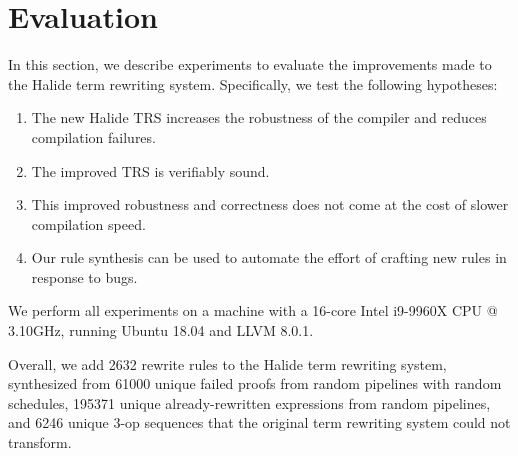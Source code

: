 \documentclass[sigplan,10pt,review,anonymous]{acmart}\settopmatter{printfolios=true,printccs=false,printacmref=false}
\newcommand{\NumRulesSynthesized}{{\color{black} 2632}\xspace}
\newcommand{\NumOpSequences}{{\color{black} 6246}\xspace}
\newcommand{\NumFailureExamples}{{\color{black} 61000}\xspace}
\newcommand{\NumSimplifiedExpressions}{{\color{black} 195371}\xspace}
\begin{document}
\section{Evaluation}
In this section, we describe experiments to evaluate the improvements made to the Halide term rewriting system.  Specifically, we
test the following hypotheses:
\begin{enumerate}
\item The new Halide TRS increases the robustness of the compiler and reduces compilation failures.
\item The improved TRS is verifiably sound.
\item This improved robustness and correctness does not come at the cost of slower compilation speed.
\item Our rule synthesis can be used to automate the effort of crafting new rules in response to bugs.
\end{enumerate}

We perform all experiments on a machine with a 16-core Intel i9-9960X CPU @ 3.10GHz,
running Ubuntu 18.04 and LLVM 8.0.1.



Overall, we add \NumRulesSynthesized rewrite rules to the Halide term rewriting system, synthesized
from \NumFailureExamples unique failed proofs from random pipelines with random schedules, \NumSimplifiedExpressions
unique already-rewritten expressions from random pipelines, and \NumOpSequences unique 3-op sequences
that the original term rewriting system could not transform.  
\end{document}
